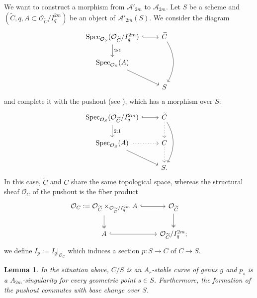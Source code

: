 \documentclass{alggeom}
\numberwithin{equation}{section}
\numberwithin{subsection}{section}
\newtheorem{lemma}[theorem]{Lemma}
\theoremstyle{definition}
\theoremstyle{remark}
\newcommand\cA{\mathcal{A}} \newcommand\cB{\mathcal{B}}
\newcommand\cO{\mathcal{O}} \newcommand\cP{\mathcal{P}}
\newcommand\spec{\operatorname{Spec}}
\begin{document}
We want to construct a morphism from $\cA'_{2m}$ to $\cA_{2m}$. Let $S$ be a scheme and $(\widetilde{C},q, A \subset \cO_{\widetilde{C}}/I_q^{2m})$ be an object of $\cA'_{2m}(S)$. We consider the diagram 
$$
\begin{tikzcd}
	\spec_{\cO_S}(\cO_{\widetilde{C}}/I_q^{2m}) \arrow[d, "2:1"] \arrow[r, hook] & \widetilde{C} \arrow[dd, bend left] \\
	\spec_{\cO_S}(A) \arrow[rd]                                                  &                                     \\
	& S                                  
\end{tikzcd}
$$
and complete it with the pushout (see ), which has a morphism over $S$:
$$
\begin{tikzcd}
	\spec_{\cO_S}(\cO_{\widetilde{C}}/I_q^{2m}) \arrow[d, "2:1"] \arrow[r, hook] & \widetilde{C} \arrow[dd, bend left] \arrow[d, dotted] \\
	\spec_{\cO_S}(A) \arrow[rd] \arrow[r, dotted]                                & C \arrow[d, dotted]                                   \\
	& S.                                                    
\end{tikzcd}
$$
In this case, $\widetilde{C}$ and $C$ share the same topological space, whereas the structural sheaf $\cO_C$ of the pushout is the fiber product 
$$
\begin{tikzcd}
	\cO_C:=\cO_{\widetilde{C}}\times_{\cO_{\widetilde{C}}/I_q^{2m}} A \arrow[d, two heads] \arrow[r, hook] & \cO_{\widetilde{C}} \arrow[d, two heads] \\
	A \arrow[r, hook]                                                                                 & \cO_{\widetilde{C}}/I_q^{2m};         
\end{tikzcd}
$$
we define $I_p:=I_q\vert_{\cO_C}$ which induces a section $p:S \rightarrow C$ of $C\rightarrow S$.


\begin{lemma}
	In the situation above, $C/S$ is an $A_r$-stable curve of genus $g$ and $p_s$ is a $A_{2m}$-singularity for every geometric point $s \in S$. Furthermore, the formation of the pushout commutes with base change over $S$.
\end{lemma}
\end{document}
